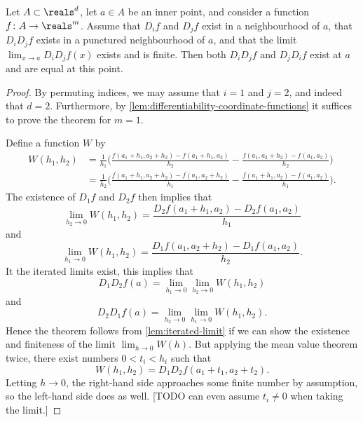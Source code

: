 \documentclass[article, a4paper, 11pt, oneside]{memoir}
\numberwithin{equation}{chapter}
\begin{document}
\begin{theorem}
    Let $A \subset \reals^d$, let $a \in A$ be an inner point, and consider a function $f \colon A \to \reals^m$. Assume that $D_i f$ and $D_j f$ exist in a neighbourhood of $a$, that $D_i D_j f$ exists in a punctured neighbourhood of $a$, and that the limit $\lim_{x \to a} D_i D_j f(x)$ exists and is finite. Then both $D_i D_j f$ and $D_j D_i f$ exist at $a$ and are equal at this point.
\end{theorem}

\begin{proof}
    By permuting indices, we may assume that $i = 1$ and $j = 2$, and indeed that $d = 2$. Furthermore, by \cref{lem:differentiability-coordinate-functions} it suffices to prove the theorem for $m = 1$.

    Define a function $W$ by
    \begin{align*}
        W(h_1,h_2)
            &= \frac{1}{h_1} \biggl( \frac{f(a_1 + h_1, a_2 + h_2) - f(a_1 + h_1, a_2)}{h_2} - \frac{f(a_1, a_2 + h_2) - f(a_1, a_2)}{h_2} \biggr) \\
            &= \frac{1}{h_2} \biggl( \frac{f(a_1 + h_1, a_2 + h_2) - f(a_1, a_2 + h_2)}{h_1} - \frac{f(a_1 + h_1, a_2) - f(a_1, a_2)}{h_1} \biggr).
    \end{align*}
    The existence of $D_1 f$ and $D_2 f$ then implies that
    \begin{equation*}
        \lim_{h_2 \to 0} W(h_1,h_2)
            = \frac{D_2 f(a_1 + h_1, a_2) - D_2 f(a_1, a_2)}{h_1}
    \end{equation*}
    and
    \begin{equation*}
        \lim_{h_1 \to 0} W(h_1,h_2)
            = \frac{D_1 f(a_1, a_2 + h_2) - D_1 f(a_1, a_2)}{h_2}.
    \end{equation*}
    It the iterated limits exist, this implies that
    \begin{equation*}
        D_1 D_2 f(a)
            = \lim_{h_1 \to 0} \lim_{h_2 \to 0} W(h_1,h_2)
    \end{equation*}
    and
    \begin{equation*}
        D_2 D_1 f(a)
            = \lim_{h_2 \to 0} \lim_{h_1 \to 0} W(h_1,h_2).
    \end{equation*}
    Hence the theorem follows from \cref{lem:iterated-limit} if we can show the existence and finiteness of the limit $\lim_{h \to 0} W(h)$. But applying the mean value theorem twice, there exist numbers $0 < t_i < h_i$ such that
    \begin{equation*}
        W(h_1,h_2)
            = D_1 D_2 f(a_1 + t_1, a_2 + t_2).
    \end{equation*}
    Letting $h \to 0$, the right-hand side approaches some finite number by assumption, so the left-hand side does as well. [TODO can even assume $t_i \neq 0$ when taking the limit.]
\end{proof}
\end{document}
